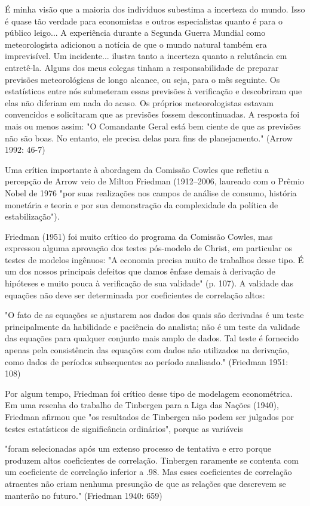 \documentclass[12pt]{article}
\begin{document}
É minha visão que a maioria dos indivíduos subestima a incerteza do mundo. Isso é quase tão verdade para economistas e outros especialistas quanto é para o público leigo... A experiência durante a Segunda Guerra Mundial como meteorologista adicionou a notícia de que o mundo natural também era imprevisível. Um incidente... ilustra tanto a incerteza quanto a relutância em entretê-la. Alguns dos meus colegas tinham a responsabilidade de preparar previsões meteorológicas de longo alcance, ou seja, para o mês seguinte. Os estatísticos entre nós submeteram essas previsões à verificação e descobriram que elas não diferiam em nada do acaso. Os próprios meteorologistas estavam convencidos e solicitaram que as previsões fossem descontinuadas. A resposta foi mais ou menos assim: "O Comandante Geral está bem ciente de que as previsões não são boas. No entanto, ele precisa delas para fins de planejamento."
(Arrow 1992: 46-7)

Uma crítica importante à abordagem da Comissão Cowles que refletiu a percepção de Arrow veio de Milton Friedman (1912–2006, laureado com o Prêmio Nobel de 1976 "por suas realizações nos campos de análise de consumo, história monetária e teoria e por sua demonstração da complexidade da política de estabilização").

Friedman (1951) foi muito crítico do programa da Comissão Cowles, mas expressou alguma aprovação dos testes pós-modelo de Christ, em particular os testes de modelos ingênuos: "A economia precisa muito de trabalhos desse tipo. É um dos nossos principais defeitos que damos ênfase demais à derivação de hipóteses e muito pouca à verificação de sua validade" (p. 107). A validade das equações não deve ser determinada por coeficientes de correlação altos:

"O fato de as equações se ajustarem aos dados dos quais são derivadas é um teste principalmente da habilidade e paciência do analista; não é um teste da validade das equações para qualquer conjunto mais amplo de dados. Tal teste é fornecido apenas pela consistência das equações com dados não utilizados na derivação, como dados de períodos subsequentes ao período analisado."
(Friedman 1951: 108)

Por algum tempo, Friedman foi crítico desse tipo de modelagem econométrica. Em uma resenha do trabalho de Tinbergen para a Liga das Nações (1940), Friedman afirmou que "os resultados de Tinbergen não podem ser julgados por testes estatísticos de significância ordinários", porque as variáveis

"foram selecionadas após um extenso processo de tentativa e erro porque produzem altos coeficientes de correlação. Tinbergen raramente se contenta com um coeficiente de correlação inferior a .98. Mas esses coeficientes de correlação atraentes não criam nenhuma presunção de que as relações que descrevem se manterão no futuro."
(Friedman 1940: 659)
\end{document}
